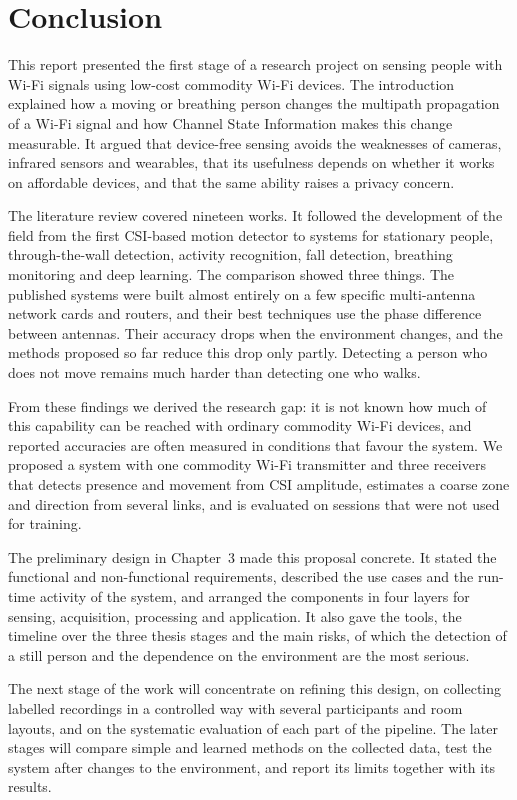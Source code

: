 \chapter{Conclusion}
This report presented the first stage of a research project on sensing people with Wi-Fi signals using low-cost commodity Wi-Fi devices. The introduction explained how a moving or breathing person changes the multipath propagation of a Wi-Fi signal and how Channel State Information makes this change measurable. It argued that device-free sensing avoids the weaknesses of cameras, infrared sensors and wearables, that its usefulness depends on whether it works on affordable devices, and that the same ability raises a privacy concern.

The literature review covered nineteen works. It followed the development of the field from the first CSI-based motion detector to systems for stationary people, through-the-wall detection, activity recognition, fall detection, breathing monitoring and deep learning. The comparison showed three things. The published systems were built almost entirely on a few specific multi-antenna network cards and routers, and their best techniques use the phase difference between antennas. Their accuracy drops when the environment changes, and the methods proposed so far reduce this drop only partly. Detecting a person who does not move remains much harder than detecting one who walks.

From these findings we derived the research gap: it is not known how much of this capability can be reached with ordinary commodity Wi-Fi devices, and reported accuracies are often measured in conditions that favour the system. We proposed a system with one commodity Wi-Fi transmitter and three receivers that detects presence and movement from CSI amplitude, estimates a coarse zone and direction from several links, and is evaluated on sessions that were not used for training.

The preliminary design in Chapter~3 made this proposal concrete. It stated the functional and non-functional requirements, described the use cases and the run-time activity of the system, and arranged the components in four layers for sensing, acquisition, processing and application. It also gave the tools, the timeline over the three thesis stages and the main risks, of which the detection of a still person and the dependence on the environment are the most serious.

The next stage of the work will concentrate on refining this design, on collecting labelled recordings in a controlled way with several participants and room layouts, and on the systematic evaluation of each part of the pipeline. The later stages will compare simple and learned methods on the collected data, test the system after changes to the environment, and report its limits together with its results.

